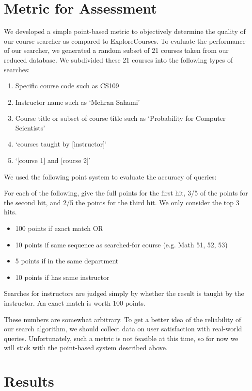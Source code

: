 \documentclass[12pt]{article}
\begin{document}
\section*{Metric for Assessment}
We developed a simple point-based metric to objectively determine the
quality of our course searcher as compared to ExploreCourses. To
evaluate the performance of our searcher, we generated a random subset
of 21 courses taken from our reduced database. We subdivided these 21
courses into the following types of searches: 

\begin{enumerate}
\item Specific course code such as CS109
\item Instructor name such as `Mehran Sahami'
\item Course title or subset of course title such as `Probability for Computer Scientists'
\item `courses taught by [instructor]'
\item `[course 1] and [course 2]'
\end{enumerate}

We used the following point system to evaluate the accuracy of queries: 

For each of the following, give the full points for the first hit, 3/5
of the points for the second hit, and 2/5 the points for the third
hit. We only consider the top 3 hits.

\begin{itemize}
\item 100 points if exact match OR
\item 10 points if same sequence as searched-for course (e.g. Math 51,
  52, 53)
\item 5 points if in the same department
\item 10 points if has same instructor
\end{itemize}

Searches for instructors are judged simply by whether the result is
taught by the instructor. An exact match is worth 100 points.

These numbers are somewhat arbitrary. To get a better idea of the
reliability of our search algorithm, we should collect data on user
satisfaction with real-world queries. Unfortunately, such a metric is
not feasible at this time, so for now we will stick with the
point-based system described above.

\section*{Results}
\end{document}
